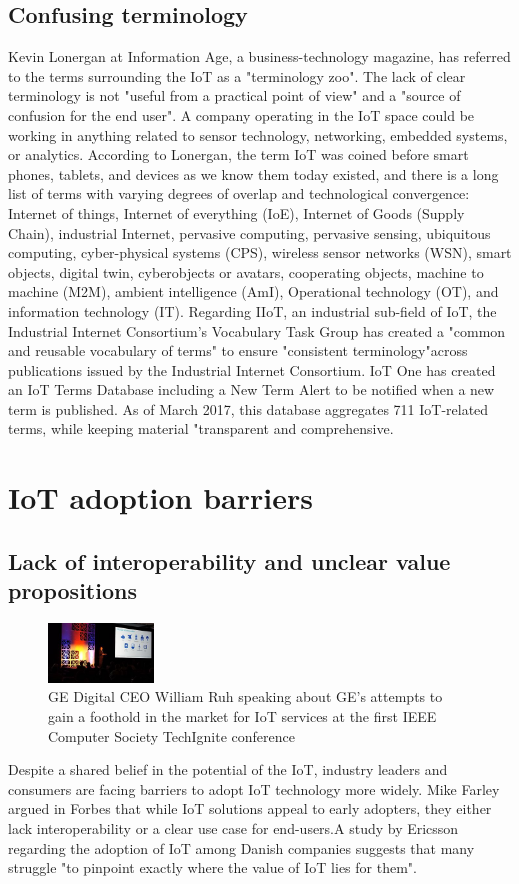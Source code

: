 \documentclass[12pt, a4paper, twoside]{article}
\begin{document}
\subsection{Confusing terminology}
Kevin Lonergan at Information Age, a business-technology magazine, has referred to the terms surrounding the IoT as a "terminology zoo". The lack of clear terminology is not "useful from a practical point of view" and a "source of confusion for the end user". A company operating in the IoT space could be working in anything related to sensor technology, networking, embedded systems, or analytics. According to Lonergan, the term IoT was coined before smart phones, tablets, and devices as we know them today existed, and there is a long list of terms with varying degrees of overlap and technological convergence: Internet of things, Internet of everything (IoE), Internet of Goods (Supply Chain), industrial Internet, pervasive computing, pervasive sensing, ubiquitous computing, cyber-physical systems (CPS), wireless sensor networks (WSN), smart objects, digital twin, cyberobjects or avatars, cooperating objects, machine to machine (M2M), ambient intelligence (AmI), Operational technology (OT), and information technology (IT). Regarding IIoT, an industrial sub-field of IoT, the Industrial Internet Consortium's Vocabulary Task Group has created a "common and reusable vocabulary of terms" to ensure "consistent terminology"across publications issued by the Industrial Internet Consortium. IoT One has created an IoT Terms Database including a New Term Alert to be notified when a new term is published. As of March 2017, this database aggregates 711 IoT-related terms, while keeping material "transparent and comprehensive.

\section{IoT adoption barriers}
\subsection{Lack of interoperability and unclear value propositions}

\begin{figure} %
    \centering
    \includegraphics[width=0.25\textwidth]{gdc}
    \caption{GE Digital CEO William Ruh speaking about GE's attempts to gain a foothold in the market for IoT services at the first IEEE Computer Society TechIgnite conference}
\end{figure}
Despite a shared belief in the potential of the IoT, industry leaders and consumers are facing barriers to adopt IoT technology more widely. Mike Farley argued in Forbes that while IoT solutions appeal to early adopters, they either lack interoperability or a clear use case for end-users.A study by Ericsson regarding the adoption of IoT among Danish companies suggests that many struggle "to pinpoint exactly where the value of IoT lies for them".
\end{document}
